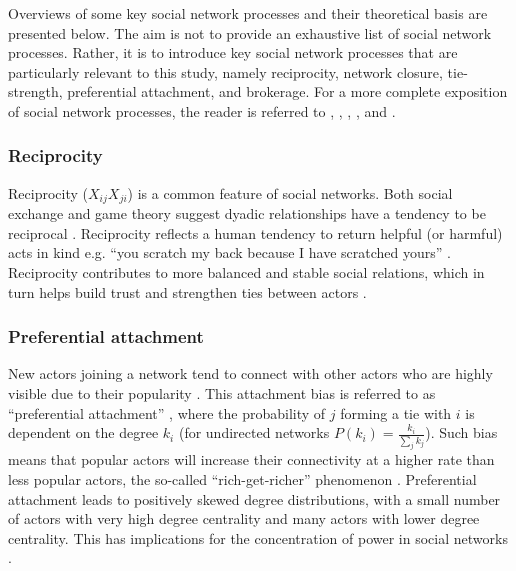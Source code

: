 Overviews of some key social network processes and their theoretical basis are presented below. The aim is not to provide an exhaustive list of social network processes. Rather, it is to introduce key social network processes that are particularly relevant to this study, namely reciprocity, network closure, tie-strength, preferential attachment, and brokerage. For a more complete exposition of social network processes, the reader is referred to  \citet{burt2005brokerage}, \citet{knoke2008social}, \citet{de2011exploratory}, \citet{kadushin2012understanding}, and \citet{scott2017social}. \medskip

\subsubsection{Reciprocity}

Reciprocity (\(X_{ij}X_{ji}\)) is a common feature of social networks. Both social exchange and game theory suggest dyadic relationships have a tendency to be reciprocal \citep{emerson1976social,axelrod1984evolution}. Reciprocity reflects a human tendency to return helpful (or harmful) acts in kind e.g. \enquote{you scratch my back because I have scratched yours} \citep{nowak2005evolution}. Reciprocity contributes to more balanced and stable social relations, which in turn helps build trust and strengthen ties between actors \citep{blau1964exchange}. \medskip

\subsubsection{Preferential attachment}

New actors joining a network tend to connect with other actors who are highly visible due to their popularity \citep{desollaprice976general}. This attachment bias is referred to as \enquote{preferential attachment} \citep{barabasi1999emergence}, where the probability of \(j\) forming a tie with \(i\) is dependent on the degree \(k_{i}\) (for undirected networks \(P(k_{i})=\frac{k_{i}}{\sum_{j}k_{j}}\)). Such bias means that popular actors will increase their connectivity at a higher rate than less popular actors, the so-called \enquote{rich-get-richer} phenomenon \citep{desollaprice1976general,adamic2000power,easley2010power}.  Preferential attachment leads to positively skewed degree distributions, with a small number of actors with very high degree centrality and many actors with lower degree centrality. This has implications for the concentration of power in social networks \citep{emerson1962power}. \medskip 

